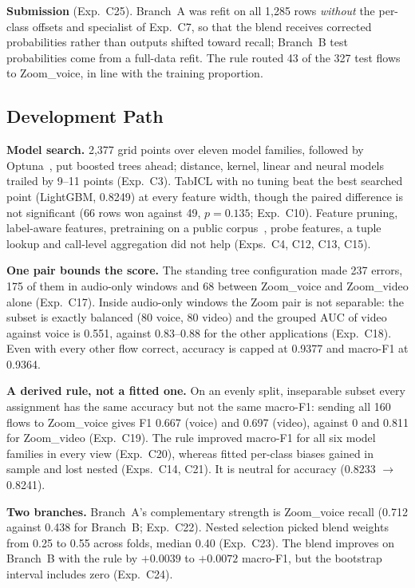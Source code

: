 \noindent\textbf{Submission} (Exp.~C25). Branch~A was refit on all 1{,}285 rows
\emph{without} the per-class offsets and specialist of Exp.~C7, so that the blend
receives corrected probabilities rather than outputs shifted toward recall; Branch~B
test probabilities come from a full-data refit. The rule routed 43 of the 327 test
flows to Zoom\_voice, in line with the training proportion.

\subsection{Development Path}
\label{sec:t3-experiments}

\noindent\textbf{Model search.} 2{,}377 grid points over eleven model families, followed
by Optuna~\cite{optuna}, put boosted trees ahead; distance, kernel, linear and neural
models trailed by 9--11 points (Exp.~C3). TabICL with no tuning beat the best searched
point (LightGBM, 0.8249) at every feature width, though the paired difference is not
significant (66 rows won against 49, $p=0.135$; Exp.~C10). Feature pruning,
label-aware features, pretraining on a public corpus~\cite{mirage}, probe features, a
tuple lookup and call-level aggregation did not help (Exps.~C4, C12, C13, C15).

\noindent\textbf{One pair bounds the score.} The standing tree configuration made 237
errors, 175 of them in audio-only windows and 68 between Zoom\_voice and Zoom\_video
alone (Exp.~C17). Inside audio-only windows the Zoom pair is not separable: the subset
is exactly balanced (80 voice, 80 video) and the grouped AUC of video against voice is
0.551, against 0.83--0.88 for the other applications (Exp.~C18). Even with every other
flow correct, accuracy is capped at 0.9377 and macro-F1 at 0.9364.

\noindent\textbf{A derived rule, not a fitted one.} On an evenly split, inseparable
subset every assignment has the same accuracy but not the same macro-F1: sending all
160 flows to Zoom\_voice gives F1 0.667 (voice) and 0.697 (video), against 0 and 0.811
for Zoom\_video (Exp.~C19). The rule improved macro-F1 for all six model families in
every view (Exp.~C20), whereas fitted per-class biases gained in sample and lost nested
(Exps.~C14, C21). It is neutral for accuracy (0.8233 $\rightarrow$ 0.8241).

\noindent\textbf{Two branches.} Branch~A's complementary strength is Zoom\_voice
recall (0.712 against 0.438 for Branch~B; Exp.~C22). Nested selection picked blend weights from 0.25 to 0.55 across
folds, median 0.40 (Exp.~C23). The blend improves on Branch~B with the rule by
$+0.0039$ to $+0.0072$ macro-F1, but the bootstrap interval includes zero (Exp.~C24).

